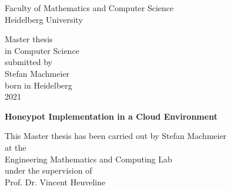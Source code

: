 \thispagestyle{empty}
\begin{center}
  \renewcommand{\baselinestretch}{2.00}
  \Large%
  Faculty of Mathematics and Computer Science\\
  \large Heidelberg University
  \par\vfill\normalfont
  Master thesis\\
  in Computer Science\\
  submitted by\\
  Stefan Machmeier\\
  born in Heidelberg\\
  2021
\end{center}
\newpage

\thispagestyle{empty}
\begin{center}
  \renewcommand{\baselinestretch}{2.00}
  \Large\bfseries%
    Honeypot Implementation in a Cloud Environment
  \par
  \vfill
  \large\normalfont
  This Master thesis has been carried out by Stefan Machmeier\\
  at the\\
  Engineering Mathematics and Computing Lab\\
  under the supervision of\\
  Prof. Dr. Vincent Heuveline
\end{center}\par
\vspace{5\baselineskip}

\renewcommand{\baselinestretch}{1.00}\normalsize
